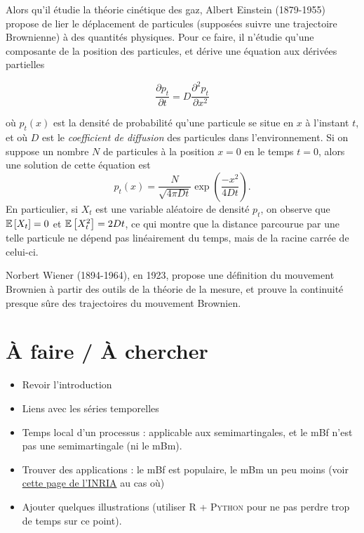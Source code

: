 Alors qu'il étudie la théorie cinétique des gaz, Albert Einstein
(1879-1955) propose de lier le déplacement de particules (supposées
suivre une trajectoire Brownienne) à des quantités physiques. Pour ce
faire, il n'étudie qu'une composante de la position des particules, et
dérive une équation aux dérivées partielles

\begin{equation*}
  \frac{\partial p_t}{\partial t} = D \frac{\partial^2 p_t}{\partial x^2}
\end{equation*}

où $p_t(x)$ est la densité de probabilité qu'une particule se situe en
$x$ à l'instant $t$, et où $D$ est le \emph{coefficient de diffusion}
des particules dans l'environnement. Si on suppose un nombre $N$ de
particules à la position $x=0$ en le temps $t=0$, alors une solution
de cette équation est
\begin{equation*}
  p_t(x) = \frac{N}{\sqrt{4\pi Dt}}\exp(\frac{-x^2}{4Dt}).
\end{equation*}
En particulier, si $X_t$ est une variable aléatoire de densité $p_t$,
on observe que $\mathbb{E}\left[X_t\right] = 0$ et $\mathbb{E}\left[X_t^2\right] = 2Dt$, ce qui montre
que la distance parcourue par une telle particule ne dépend pas
linéairement du temps, mais de la racine carrée de celui-ci.

Norbert Wiener (1894-1964), en 1923, propose une définition du
mouvement Brownien à partir des outils de la théorie de la mesure, et
prouve la continuité presque sûre des trajectoires du mouvement
Brownien.

\section{À faire / À chercher}
\begin{itemize}
\item Revoir l'introduction
\item Liens avec les séries temporelles
\item Temps local d'un processus : applicable aux semimartingales, et
  le mBf n'est pas une semimartingale (ni le mBm).
\item Trouver des applications : le mBf est populaire, le mBm un peu
  moins (voir
  \href{https://team.inria.fr/anja/english-theoretical-aspects/multifractional-brownian-motion/multifractional-brownian-motion-bibliography/}{cette page de l'INRIA}
  au cas où)
\item Ajouter quelques illustrations (utiliser \textsc{R} +
  \textsc{Python} pour ne pas perdre trop de temps sur ce point).
\end{itemize}